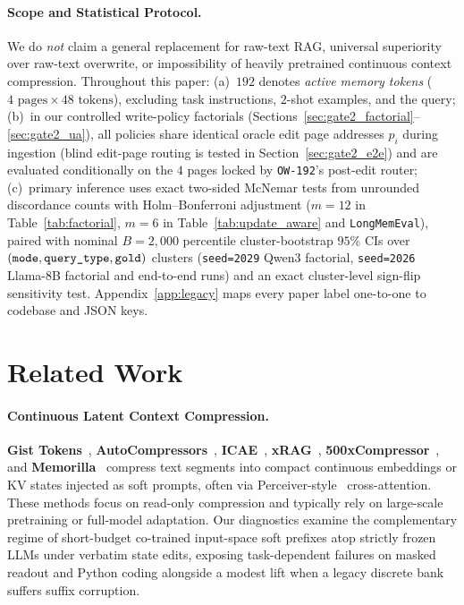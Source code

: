 \documentclass[11pt]{article}
\renewcommand{\_}{\origunderscore\allowbreak}
\begin{document}
\paragraph{Scope and Statistical Protocol.}
We do \emph{not} claim a general replacement for raw-text RAG, universal superiority over raw-text overwrite, or impossibility of heavily pretrained continuous context compression. Throughout this paper: (a)~$192$ denotes \emph{active memory tokens} ($4\text{ pages}\times 48\text{ tokens}$), excluding task instructions, $2$-shot examples, and the query; (b)~in our controlled write-policy factorials (Sections~\ref{sec:gate2_factorial}--\ref{sec:gate2_ua}), all policies share identical oracle edit page addresses $p_i$ during ingestion (blind edit-page routing is tested in Section~\ref{sec:gate2_e2e}) and are evaluated conditionally on the $4$ pages locked by \texttt{OW-192}'s post-edit router; (c)~primary inference uses exact two-sided McNemar tests from unrounded discordance counts with Holm--Bonferroni adjustment ($m=12$ in Table~\ref{tab:factorial}, $m=6$ in Table~\ref{tab:update_aware} and \texttt{LongMemEval}), paired with nominal $B=2{,}000$ percentile cluster-bootstrap $95\%$ CIs over $( \texttt{mode}, \texttt{query\_type}, \texttt{gold} )$ clusters (\texttt{seed=2029} Qwen3 factorial, \texttt{seed=2026} Llama-8B factorial and end-to-end runs) and an exact cluster-level sign-flip sensitivity test. Appendix~\ref{app:legacy} maps every paper label one-to-one to codebase and JSON keys.

\section{Related Work}
\label{sec:related}

\paragraph{Continuous Latent Context Compression.}
\textbf{Gist Tokens}~\cite{mu2023gist}, \textbf{AutoCompressors}~\cite{chevalier2023autocompressors}, \textbf{ICAE}~\cite{ge2024icae}, \textbf{xRAG}~\cite{cheng2024xrag}, \textbf{500xCompressor}~\cite{li2025compressor500x}, and \textbf{Memorilla}~\cite{fallahpour2026memorilla} compress text segments into compact continuous embeddings or KV states injected as soft prompts, often via Perceiver-style~\cite{jaegle2021perceiver} cross-attention. These methods focus on read-only compression and typically rely on large-scale pretraining or full-model adaptation. Our diagnostics examine the complementary regime of short-budget co-trained input-space soft prefixes atop strictly frozen LLMs under verbatim state edits, exposing task-dependent failures on masked readout and Python coding alongside a modest lift when a legacy discrete bank suffers suffix corruption.
\end{document}
